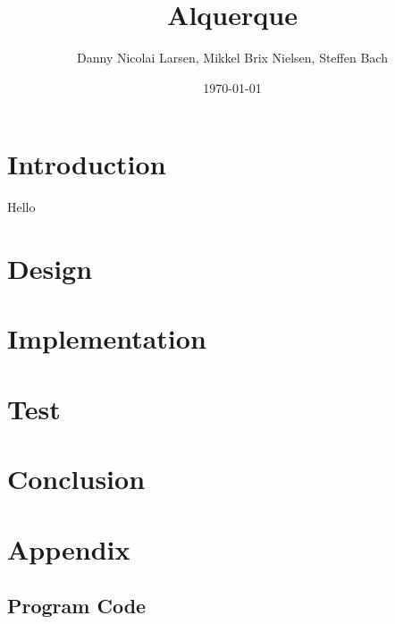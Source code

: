 \documentclass[12pt, a4paper]{article}
\title{Alquerque}
\author{Danny Nicolai Larsen, Mikkel Brix Nielsen, Steffen Bach}
\date{\today}
\begin{document}
	\maketitle
	\tableofcontents
	\newpage
	\section{Introduction}
	Hello
	\section{Design}
	\section{Implementation}
	\section{Test}
	\section{Conclusion}
	\section{Appendix}
	\subsection{Program Code}
	
\end{document}
